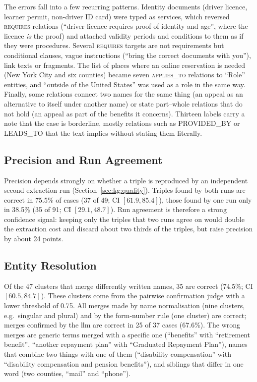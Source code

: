The errors fall into a few recurring patterns. Identity documents (driver licence,
learner permit, non-driver ID card) were typed as services, which reversed
\textsc{requires} relations (``driver licence requires proof of identity and age'', where
the licence \emph{is} the proof) and attached validity periods and conditions to them as
if they were procedures. Several \textsc{requires}
targets are not requirements but conditional clauses, vague instructions (``bring the
correct documents with you''), link texts or fragments. The list of places where an
online reservation is needed (New York City and six counties) became seven
\textsc{applies\_to} relations to ``Role'' entities, and ``outside of the United
States'' was used as a role in the same way. Finally, some relations connect two names
for the same thing (an appeal as an alternative to itself under another name) or state
part--whole relations that do not hold (an appeal as part of the benefits it concerns).
Thirteen labels carry a note that the case is borderline, mostly relations such as
PROVIDED\_BY or LEADS\_TO that the text implies without stating them literally.

\subsection{Precision and Run Agreement}

Precision depends strongly on whether a triple is reproduced by an independent second
extraction run (Section~\ref{sec:kg:quality}). Triples found by both runs are correct
in 75.5\% of cases (37 of 49; CI $[61.9, 85.4]$), those found by one run only in 38.5\%
(35 of 91; CI $[29.1, 48.7]$). Run agreement is therefore a strong confidence signal:
keeping only the triples that two runs agree on would double the extraction cost and
discard about two thirds of the triples, but raise precision by about 24 points.

\subsection{Entity Resolution}

Of the 47 clusters that merge differently written names, 35 are correct (74.5\%; CI
$[60.5, 84.7]$). These clusters come from the pairwise confirmation judge with a lower
threshold of 0.75. All merges made by name normalisation (nine clusters, e.g.\ singular
and plural) and by the form-number rule (one cluster) are correct; merges confirmed by
the \gls{llm} are correct in 25 of 37 cases (67.6\%). The wrong merges are generic terms
merged with a specific one (``benefits'' with ``retirement benefit'', ``another
repayment plan'' with ``Graduated Repayment Plan''), names that combine two things with
one of them (``disability compensation'' with ``disability compensation and pension
benefits''), and siblings that differ in one word (two counties, ``mail'' and
``phone'').

